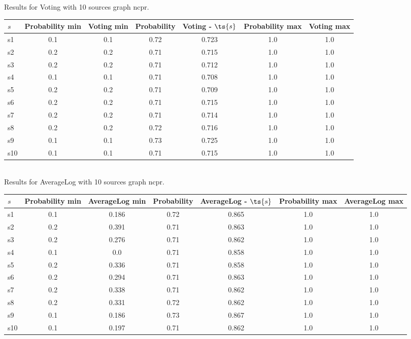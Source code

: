 \documentclass{article}
\begin{document}
\noindent Results for Voting with 10 sources graph ncpr.

\noindent\begin{tabular}{|l|c|c|c|c|c|c|}
\hline
$s$& Probability min & Voting min & Probability & Voting - $\ts{s}$ & Probability max & Voting max\\
\hline
s1 &0.1 & 0.1 & 0.72 & 0.723 & 1.0 & 1.0\\
\hline
s2 &0.2 & 0.2 & 0.71 & 0.715 & 1.0 & 1.0\\
\hline
s3 &0.2 & 0.2 & 0.71 & 0.712 & 1.0 & 1.0\\
\hline
s4 &0.1 & 0.1 & 0.71 & 0.708 & 1.0 & 1.0\\
\hline
s5 &0.2 & 0.2 & 0.71 & 0.709 & 1.0 & 1.0\\
\hline
s6 &0.2 & 0.2 & 0.71 & 0.715 & 1.0 & 1.0\\
\hline
s7 &0.2 & 0.2 & 0.71 & 0.714 & 1.0 & 1.0\\
\hline
s8 &0.2 & 0.2 & 0.72 & 0.716 & 1.0 & 1.0\\
\hline
s9 &0.1 & 0.1 & 0.73 & 0.725 & 1.0 & 1.0\\
\hline
s10 &0.1 & 0.1 & 0.71 & 0.715 & 1.0 & 1.0\\
\hline
\end{tabular}\\

\noindent Results for AverageLog with 10 sources graph ncpr.

\noindent\begin{tabular}{|l|c|c|c|c|c|c|}
\hline
$s$& Probability min & AverageLog min & Probability & AverageLog - $\ts{s}$ & Probability max & AverageLog max\\
\hline
s1 &0.1 & 0.186 & 0.72 & 0.865 & 1.0 & 1.0\\
\hline
s2 &0.2 & 0.391 & 0.71 & 0.863 & 1.0 & 1.0\\
\hline
s3 &0.2 & 0.276 & 0.71 & 0.862 & 1.0 & 1.0\\
\hline
s4 &0.1 & 0.0 & 0.71 & 0.858 & 1.0 & 1.0\\
\hline
s5 &0.2 & 0.336 & 0.71 & 0.858 & 1.0 & 1.0\\
\hline
s6 &0.2 & 0.294 & 0.71 & 0.863 & 1.0 & 1.0\\
\hline
s7 &0.2 & 0.338 & 0.71 & 0.862 & 1.0 & 1.0\\
\hline
s8 &0.2 & 0.331 & 0.72 & 0.862 & 1.0 & 1.0\\
\hline
s9 &0.1 & 0.186 & 0.73 & 0.867 & 1.0 & 1.0\\
\hline
s10 &0.1 & 0.197 & 0.71 & 0.862 & 1.0 & 1.0\\
\hline
\end{tabular}\\
\end{document}
